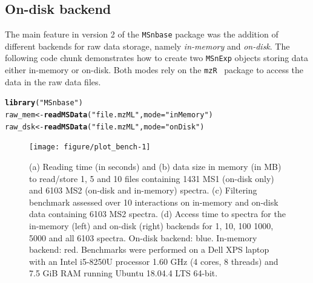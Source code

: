 \documentclass[journal=jacsat,manuscript=article]{achemso}\usepackage[]{graphicx}\usepackage[]{color}
\makeatletter
\newcommand{\hlstr}[1]{\textcolor[rgb]{0.192,0.494,0.8}{#1}}%
\newcommand{\hlstd}[1]{\textcolor[rgb]{0.345,0.345,0.345}{#1}}%
\newcommand{\hlkwb}[1]{\textcolor[rgb]{0.69,0.353,0.396}{#1}}%
\newcommand{\hlkwc}[1]{\textcolor[rgb]{0.333,0.667,0.333}{#1}}%
\newcommand{\hlkwd}[1]{\textcolor[rgb]{0.737,0.353,0.396}{\textbf{#1}}}%
\newenvironment{kframe}{%
 \def\at@end@of@kframe{}%
 \ifinner\ifhmode%
  \def\at@end@of@kframe{\end{minipage}}%
  \begin{minipage}{\columnwidth}%
 \fi\fi%
 \def\FrameCommand##1{\hskip\@totalleftmargin \hskip-\fboxsep
 \colorbox{shadecolor}{##1}\hskip-\fboxsep
     \hskip-\linewidth \hskip-\@totalleftmargin \hskip\columnwidth}%
 \MakeFramed {\advance\hsize-\width
   \@totalleftmargin\z@ \linewidth\hsize
   \@setminipage}}%
 {\par\unskip\endMakeFramed%
 \at@end@of@kframe}
\newenvironment{knitrout}{}{} %
\makeatother
\begin{document}
\subsection{On-disk backend}

The main feature in version 2 of the \texttt{MSnbase} package was the
addition of different backends for raw data storage, namely
\textit{in-memory} and \textit{on-disk}. The following code chunk
demonstrates how to create two \texttt{MSnExp} objects storing data
either in-memory or on-disk. Both modes rely on the
\texttt{mzR}~\cite{Chambers:2012} package to access the data in the
raw data files.

\begin{knitrout}
\color{fgcolor}\begin{kframe}
\begin{alltt}
\hlkwd{library}\hlstd{(}\hlstr{"MSnbase"}\hlstd{)}
\hlstd{raw_mem} \hlkwb{<-} \hlkwd{readMSData}\hlstd{(}\hlstr{"file.mzML"}\hlstd{,} \hlkwc{mode} \hlstd{=} \hlstr{"inMemory"}\hlstd{)}
\hlstd{raw_dsk} \hlkwb{<-} \hlkwd{readMSData}\hlstd{(}\hlstr{"file.mzML"}\hlstd{,} \hlkwc{mode} \hlstd{=} \hlstr{"onDisk"}\hlstd{)}
\end{alltt}
\end{kframe}
\end{knitrout}







\begin{figure}[p]
  \centering
\begin{knitrout}
\color{fgcolor}
\texttt{[image: figure/plot\_bench-1]} 

\end{knitrout}
\caption{(a) Reading time (in seconds) and (b) data size in memory (in
  MB) to read/store 1, 5 and 10 files containing 1431 MS1 (on-disk
  only) and 6103 MS2 (on-disk and in-memory) spectra. (c) Filtering
  benchmark assessed over 10 interactions on in-memory and on-disk
  data containing 6103 MS2 spectra.  (d) Access time to spectra for
  the in-memory (left) and on-disk (right) backends for 1, 10, 100
  1000, 5000 and all 6103 spectra. On-disk backend: blue. In-memory
  backend: red. Benchmarks were performed on a Dell XPS laptop with an
  Intel i5-8250U processor 1.60 GHz (4 cores, 8 threads) and 7.5 GiB RAM
  running Ubuntu 18.04.4 LTS 64-bit. }
\label{fig:bench}
\end{figure}
\end{document}

